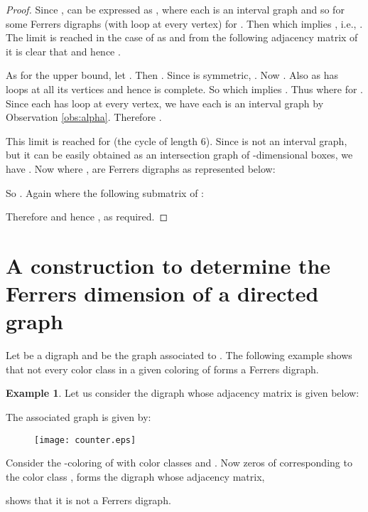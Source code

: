 \documentclass[11pt]{article}
\theoremstyle{definition}
\newtheorem{exmp}[thm]{Example}
\theoremstyle{remark}
\numberwithin{equation}{section}
\begin{document}
\begin{proof}
Since ,  can be expressed as , where each  is an interval graph and so  for some Ferrers digraphs (with loop at every vertex) for . Then  which implies , i.e., . The limit is reached in the case of  as  and from the following adjacency matrix of  it is clear that  and hence .



\vspace{1em}As for the upper bound, let . Then . Since  is symmetric, . Now . Also  as  has loops at all its vertices and hence  is complete. So  which implies . Thus  where  for . Since each  has loop at every vertex, we have each  is an interval graph by Observation \ref{obs:alpha}. Therefore .

\vspace{1em} This limit is reached for  (the cycle of length 6). Since  is not an interval graph, but it can be easily obtained as an intersection graph of -dimensional boxes, we have . Now  where , are Ferrers digraphs as represented below:

\vspace{1em}\noindent {\small }

\noindent So . Again  where  the following submatrix of :


\noindent Therefore  and hence , as required.
\end{proof}

\section{A construction to determine the Ferrers dimension of a directed graph}

Let  be a digraph and  be the graph associated to . The following example shows that not every color class in a given coloring of  forms a Ferrers digraph.

\begin{exmp}
Let us consider the digraph  whose adjacency matrix  is given below:

The associated graph  is given by:
\begin{figure}[h]
\begin{center}
\texttt{[image: counter.eps]}
\end{center}
\end{figure}

\noindent Consider the -coloring of  with color classes  and . Now zeros of  corresponding to the color class ,  forms the digraph whose adjacency matrix,

shows that it is not a Ferrers digraph.
\end{exmp}
\end{document}
